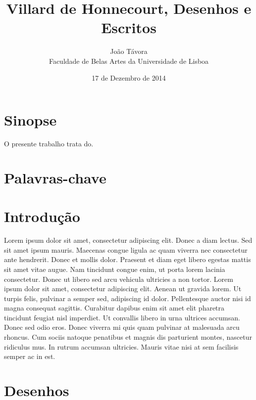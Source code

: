 \documentclass{article}
\title{Villard de Honnecourt, Desenhos e Escritos}
\date{17 de Dezembro de 2014}
\author{João Távora \\Faculdade de Belas Artes da Universidade de Lisboa}
\begin{document}

\maketitle

\section{Sinopse}          %

O presente trabalho trata do.

\section{Palavras-chave}

\section{Introdução}

Lorem ipsum dolor sit amet, consectetur adipiscing elit. Donec a diam lectus. Sed sit amet ipsum mauris. Maecenas congue ligula ac quam viverra nec consectetur ante hendrerit. Donec et mollis dolor. Praesent et diam eget libero egestas mattis sit amet vitae augue. Nam tincidunt congue enim, ut porta lorem lacinia consectetur. Donec ut libero sed arcu vehicula ultricies a non tortor. Lorem ipsum dolor sit amet, consectetur adipiscing elit. Aenean ut gravida lorem. Ut turpis felis, pulvinar a semper sed, adipiscing id dolor. Pellentesque auctor nisi id magna consequat sagittis. Curabitur dapibus enim sit amet elit pharetra tincidunt feugiat nisl imperdiet. Ut convallis libero in urna ultrices accumsan. Donec sed odio eros. Donec viverra mi quis quam pulvinar at malesuada arcu rhoncus. Cum sociis natoque penatibus et magnis dis parturient montes, nascetur ridiculus mus. In rutrum accumsan ultricies. Mauris vitae nisi at sem facilisis semper ac in est.

\section{Desenhos}
\end{document}
